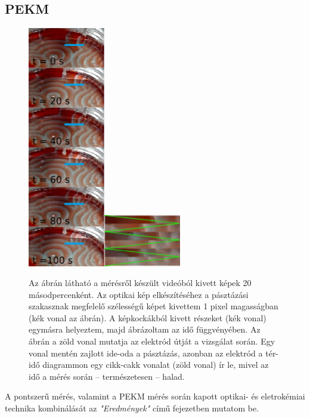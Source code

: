 \subsection{PEKM}
\begin{figure}[h!]
\centering
\includegraphics[width=0.3\textwidth]{img/pasztazas.png}\includegraphics[width=0.3\textwidth]{img/pasztazas2.png}
\caption{Az ábrán látható a mérésről készült videóból kivett képek 20 másodpercenként. Az optikai kép elkészítéséhez a pásztázási szakasznak megfelelő szélességű képet kivettem 1 pixel magasságban (kék vonal az ábrán). A képkockákból kivett részeket (kék vonal) egymásra helyeztem, majd ábrázoltam az idő függvényében. Az ábrán a zöld vonal mutatja az elektród útját a vizsgálat során. Egy vonal mentén zajlott ide-oda a pásztázás, azonban az elektród a tér-idő diagrammon egy cikk-cakk vonalat (zöld vonal) ír le, mivel az idő a mérés során -- természetesen -- halad.}
\label{fig:pasztazas}
\end{figure}

A pontszerű mérés, valamint a PEKM mérés során kapott optikai- és eletrokémiai technika kombinálását az \emph{"Eredmények"} című fejezetben mutatom be.
